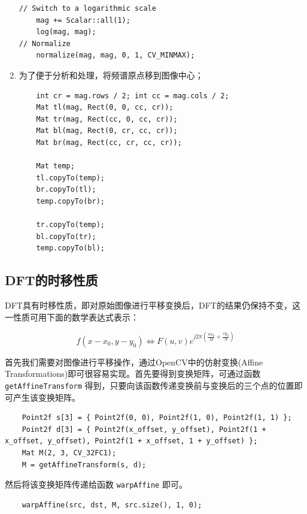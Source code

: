 \documentclass[hyperref,UTF8]{ctexart}
\begin{document}
\begin{enumerate}
\begin{lstlisting}
// Switch to a logarithmic scale
	mag += Scalar::all(1);
	log(mag, mag);
// Normalize
	normalize(mag, mag, 0, 1, CV_MINMAX);
\end{lstlisting}
\item 为了便于分析和处理，将频谱原点移到图像中心；

\begin{lstlisting}
	int cr = mag.rows / 2; int cc = mag.cols / 2;
	Mat tl(mag, Rect(0, 0, cc, cr));
	Mat tr(mag, Rect(cc, 0, cc, cr));
	Mat bl(mag, Rect(0, cr, cc, cr));
	Mat br(mag, Rect(cc, cr, cc, cr));

	Mat temp;
	tl.copyTo(temp);
	br.copyTo(tl);
	temp.copyTo(br);

	tr.copyTo(temp);
	bl.copyTo(tr);
	temp.copyTo(bl);

\end{lstlisting}

\end{enumerate}


\subsection{DFT的时移性质}


DFT具有时移性质，即对原始图像进行平移变换后，DFT的结果仍保持不变，这一性质可用下面的数学表达式表示：

\begin{equation}
f(x-x_0,y-y_0) \Leftrightarrow F(u,v)e^{j2 \pi (\frac{ux_0}{M} + \frac{vy_0}{N})}
\end{equation}

首先我们需要对图像进行平移操作，通过OpenCV中的仿射变换(Affine Transformations)即可很容易实现。首先要得到变换矩阵，可通过函数\lstinline{getAffineTransform} 得到，只要向该函数传递变换前与变换后的三个点的位置即可产生该变换矩阵。

\begin{lstlisting}
	Point2f s[3] = { Point2f(0, 0), Point2f(1, 0), Point2f(1, 1) };
	Point2f d[3] = { Point2f(x_offset, y_offset), Point2f(1 + x_offset, y_offset), Point2f(1 + x_offset, 1 + y_offset) };
	Mat M(2, 3, CV_32FC1);
	M = getAffineTransform(s, d);
\end{lstlisting}

然后将该变换矩阵传递给函数 \lstinline{warpAffine} 即可。

\begin{lstlisting}
	warpAffine(src, dst, M, src.size(), 1, 0);
\end{lstlisting}
\end{document}
